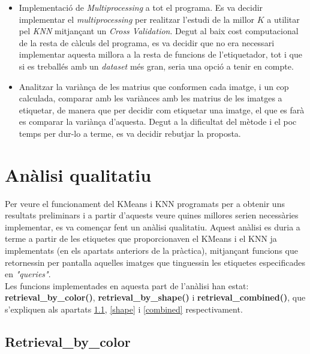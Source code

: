 \documentclass[a4paper, 11pt]{article}
\begin{document}
\begin{itemize}
    \item Implementació de \textit{Multiprocessing} a tot el programa. Es va decidir implementar el \textit{multiprocessing} per realitzar l'estudi de la millor $K$ a utilitar pel \textit{KNN} mitjançant un \textit{Cross Validation}. Degut al baix cost computacional de la resta de càlculs del programa, es va decidir que no era necessari implementar aquesta millora a la resta de funcions de l'etiquetador, tot i que si es treballés amb un \textit{dataset} més gran, seria una opció a tenir en compte.
    \item Analitzar la variànça de les matrius que conformen cada imatge, i un cop calculada, comparar amb les variànces amb les matrius de les imatges a etiquetar, de manera que per decidir com etiquetar una imatge, el que es farà es comparar la variànça d'aquesta. Degut a la dificultat del mètode i el poc temps per dur-lo a terme, es va decidir rebutjar la proposta. 
\end{itemize}
\newpage

\section{Anàlisi qualitatiu}
Per veure el funcionament del KMeans i KNN programats per a obtenir uns resultats preliminars i a partir d'aquests veure quines millores serien necessàries implementar, es va començar fent un anàlisi qualitatiu. Aquest anàlisi es duria a terme a partir de les etiquetes que proporcionaven el KMeans i el KNN ja implementats (en els apartats anteriors de la pràctica), mitjançant funcions que retornessin per pantalla aquelles imatges que tinguessin les etiquetes especificades en \textit{"queries"}.\\ Les funcions implementades en aquesta part de l'anàlisi han estat: \textbf{\textcolor{funcblue}{retrieval\_by\_color()}}, \textbf{\textcolor{funcblue}{retrieval\_by\_shape()}} i \textbf{\textcolor{funcblue}{retrieval\_combined()}}, que s'expliquen als apartats \textcolor{blue}{\ref{colors}}, \textcolor{blue}{\ref{shape}} i \textcolor{blue}{\ref{combined}} respectivament.


\newpage

\subsection{Retrieval\_by\_color}\label{colors}
\end{document}
